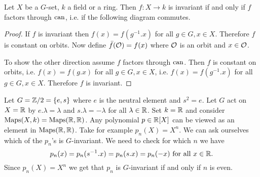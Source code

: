 \begin{lem}
 Let $X$ be a $G$-set, $k$ a field or a ring. Then $f : X \to k$ is invariant if and only if $f$ factors through $\operatorname{can}$, i.e. if the following diagram commutes.
 \begin{center}
 \end{center}
\end{lem}
\begin{proof}
 If $f$ is invariant then $f(x) = f(g^{-1}.x)$ for all $g \in G, x \in X$. Therefore $f$ is constant on orbits. Now define $\bar{f}(\mathcal{O}) = f(x)$ where $\mathcal{O}$ is an orbit and $x \in \mathcal{O}$.
 
 To show the other direction assume $f$ factors through $\operatorname{can}$. Then $f$ is constant on orbits, i.e. $f(x) = f(g.x)$ for all $g \in G, x \in X$, i.e. $f(x) = f(g^{-1}.x)$ for all $g \in G, x \in X$. Therefore $f$ is invariant.
\end{proof}


\begin{expl}
 Let $G = \mathbb{Z}/2 = \{e,s\}$ where $e$ is the neutral element and $s^2 = e$. Let $G$ act on $X = \mathbb{R}$ by $e.\lambda = \lambda$ and $s.\lambda = -\lambda$ for all $\lambda \in \mathbb{R}$. Set $k = \mathbb{R}$ and consider $\operatorname{Maps}(X,k) = \operatorname{Maps}(\mathbb{R},\mathbb{R})$. Any polynomial $p \in \mathbb{R}[X]$ can be viewed as an element in $\operatorname{Maps}(\mathbb{R},\mathbb{R})$. Take for example $p_n(X) = X^n$. We can ask ourselves which of the $p_n$’s is $G$-invariant. We need to check for which $n$ we have
 \[
  p_n(x) = p_n(s^{-1}.x) = p_n(s.x) = p_n(-x) \text{ for all } x \in \mathbb{R}.
 \]
 Since $p_n(X) = X^n$ we get that $p_n$ is $G$-invariant if and only if $n$ is even.
\end{expl}


